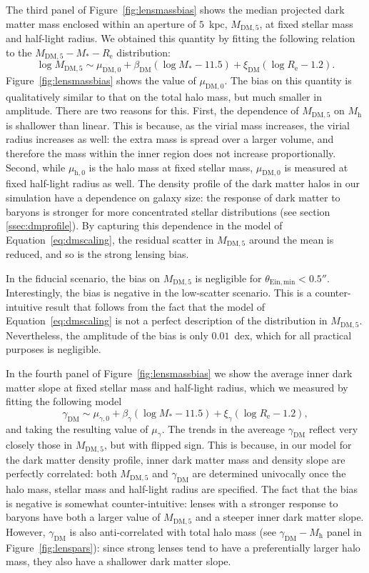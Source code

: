 \documentclass{aa}
\def\reff{R_{\mathrm{e}}}
\def\mstar{M_*}
\def\gammadm{\gamma_{\mathrm{DM}}}
\def\mdmfive{M_{\mathrm{DM}, 5}}
\def\mhalo{M_{\mathrm{h}}}
\def\Fref#1{Figure~\ref{#1}\xspace}
\def\Eref#1{Equation~\ref{#1}\xspace}
\begin{document}
The third panel of \Fref{fig:lensmassbias} shows the median projected dark matter mass enclosed within an aperture of $5$~kpc, $\mdmfive$, at fixed stellar mass and half-light radius.
We obtained this quantity by fitting the following relation to the $\mdmfive-\mstar-\reff$ distribution:
\begin{equation}\label{eq:dmscaling}
\log{\mdmfive} \sim \mu_{\mathrm{DM},0} + \beta_{\mathrm{DM}}(\log{\mstar} - 11.5) + \xi_{\mathrm{DM}}(\log{\reff} - 1.2).
\end{equation}
\Fref{fig:lensmassbias} shows the value of $\mu_{\mathrm{DM},0}$.
The bias on this quantity is qualitatively similar to that on the total halo mass, but much smaller in amplitude.
There are two reasons for this.
First, the dependence of $\mdmfive$ on $\mhalo$ is shallower than linear. This is because, as the virial mass increases, the virial radius increases as well: the extra mass is spread over a larger volume, and therefore the mass within the inner region does not increase proportionally.
Second, while $\mu_{\mathrm{h},0}$ is the halo mass at fixed stellar mass, $\mu_{\mathrm{DM},0}$ is measured at fixed half-light radius as well.
The density profile of the dark matter halos in our simulation have a dependence on galaxy size: the response of dark matter to baryons is stronger for more concentrated stellar distributions (see section \ref{ssec:dmprofile}).
By capturing this dependence in the model of \Eref{eq:dmscaling}, the residual scatter in $\mdmfive$ around the mean is reduced, and so is the strong lensing bias.

In the fiducial scenario, the bias on $\mdmfive$ is negligible for $\theta_{\mathrm{Ein,min}} < 0.5''$.
Interestingly, the bias is negative in the low-scatter scenario.
This is a counter-intuitive result that follows from the fact that the model of \Eref{eq:dmscaling} is not a perfect description of the distribution in $\mdmfive$. Nevertheless, the amplitude of the bias is only $0.01$~dex, which for all practical purposes is negligible.

In the fourth panel of \Fref{fig:lensmassbias} we show the average inner dark matter slope at fixed stellar mass and half-light radius, which we measured by fitting the following model
\begin{equation}\label{eq:dmscaling}
\gammadm \sim \mu_{\gamma,0} + \beta_{\gamma}(\log{\mstar} - 11.5) + \xi_{\gamma}(\log{\reff} - 1.2),
\end{equation}
and taking the resulting value of $\mu_{\gamma}$.
The trends in the avereage $\gammadm$ reflect very closely those in $\mdmfive$, but with flipped sign.
This is because, in our model for the dark matter density profile, inner dark matter mass and density slope are perfectly correlated: both $\mdmfive$ and $\gammadm$ are determined univocally once the halo mass, stellar mass and half-light radius are specified. The fact that the bias is negative is somewhat counter-intuitive: lenses with a stronger response to baryons have both a larger value of $\mdmfive$ and a steeper inner dark matter slope.
However, $\gammadm$ is also anti-correlated with total halo mass (see $\gammadm-\mhalo$ panel in \Fref{fig:lenspars}): since strong lenses tend to have a preferentially larger halo mass, they also have a shallower dark matter slope.
\end{document}
